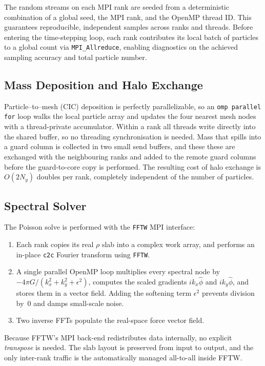 \documentclass{lkx_paper}
\begin{document}
The random streams on each MPI rank are seeded from a
deterministic combination of a global seed, the MPI rank, and the OpenMP
thread ID. This guarantees reproducible, independent samples across
ranks and threads.  Before entering the time-stepping loop,
each rank contributes its local batch of particles to a global
count via \texttt{MPI\_Allreduce}, enabling diagnostics on the
achieved sampling accuracy and total particle number.

\subsection{Mass Deposition and Halo Exchange}

Particle–to–mesh (CIC) deposition is perfectly parallelizable, so
an \texttt{omp parallel for} loop walks the local
particle array and updates the four nearest mesh nodes with a
thread-private accumulator.
Within a rank all threads write directly into the shared buffer, so no threading synchronisation is needed.
Mass that spills into a guard column is collected in
two small send buffers, and these these are exchanged with the neighbouring ranks and added to the remote guard columns before the guard-to-core copy is performed.
The resulting cost of halo exchange is \(O(2N_y)\) doubles per rank, completely independent of the number of particles.

\subsection{Spectral Solver}

The Poisson solve is performed with the \texttt{FFTW} MPI
interface:
\begin{enumerate}
  \item Each rank copies its real \(\rho\) slab into a  
        complex work array, and
        performs an in-place \texttt{c2c} Fourier transform using \texttt{FFTW}.
  \item A single parallel OpenMP loop multiplies every spectral node by
        \(-4\pi G/(k_x^2+k_y^2+\epsilon^2)\),
        computes the scaled gradients
        \(i k_x\hat{\phi}\) and \(i k_y\hat{\phi}\), and stores them
        in a vector field. Adding the softening term \(\epsilon^2\) prevents division
        by~0 and damps small-scale noise.
  \item Two inverse FFTs populate the real-space force vector field.
\end{enumerate}

Because FFTW’s MPI back-end redistributes data internally,
no explicit \emph{transpose} is needed. The slab layout is
preserved from input to output, and the only inter-rank
traffic is the automatically managed all-to-all inside FFTW.
\end{document}
